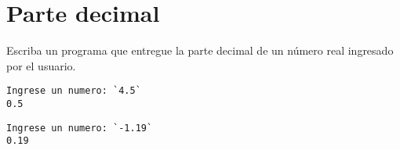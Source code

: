 \section{Parte decimal}

Escriba un programa que entregue la parte decimal de un número real
ingresado por el usuario.

\begin{lstlisting}[language=testcase]
Ingrese un numero: `4.5`
0.5
\end{lstlisting}

\begin{lstlisting}[language=testcase]
Ingrese un numero: `-1.19`
0.19
\end{lstlisting}



